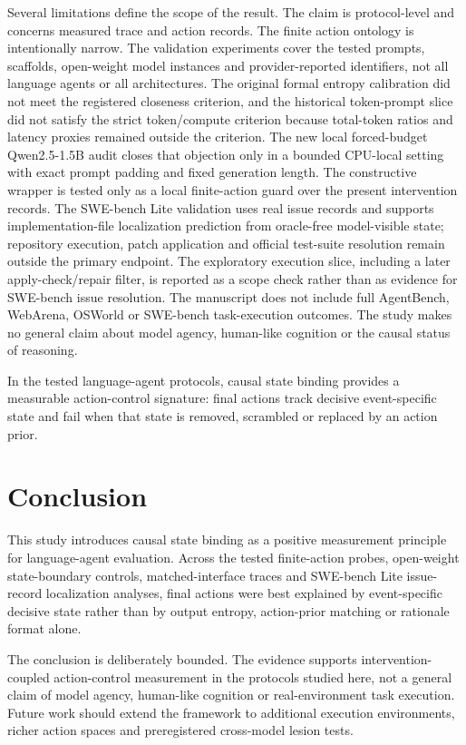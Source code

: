 ﻿\documentclass[preprint,12pt,authoryear]{elsarticle}
\begin{document}
Several limitations define the scope of the result. The claim is protocol-level and concerns measured trace and action records. The finite action ontology is intentionally narrow. The validation experiments cover the tested prompts, scaffolds, open-weight model instances and provider-reported identifiers, not all language agents or all architectures. The original formal entropy calibration did not meet the registered closeness criterion, and the historical token-prompt slice did not satisfy the strict token/compute criterion because total-token ratios and latency proxies remained outside the criterion. The new local forced-budget Qwen2.5-1.5B audit closes that objection only in a bounded CPU-local setting with exact prompt padding and fixed generation length. The constructive wrapper is tested only as a local finite-action guard over the present intervention records. The SWE-bench Lite validation uses real issue records and supports implementation-file localization prediction from oracle-free model-visible state; repository execution, patch application and official test-suite resolution remain outside the primary endpoint. The exploratory execution slice, including a later apply-check/repair filter, is reported as a scope check rather than as evidence for SWE-bench issue resolution. The manuscript does not include full AgentBench, WebArena, OSWorld or SWE-bench task-execution outcomes. The study makes no general claim about model agency, human-like cognition or the causal status of reasoning.

In the tested language-agent protocols, causal state binding provides a measurable action-control signature: final actions track decisive event-specific state and fail when that state is removed, scrambled or replaced by an action prior.

\section{Conclusion}

This study introduces causal state binding as a positive measurement principle for language-agent evaluation. Across the tested finite-action probes, open-weight state-boundary controls, matched-interface traces and SWE-bench Lite issue-record localization analyses, final actions were best explained by event-specific decisive state rather than by output entropy, action-prior matching or rationale format alone.

The conclusion is deliberately bounded. The evidence supports intervention-coupled action-control measurement in the protocols studied here, not a general claim of model agency, human-like cognition or real-environment task execution. Future work should extend the framework to additional execution environments, richer action spaces and preregistered cross-model lesion tests.
\end{document}
